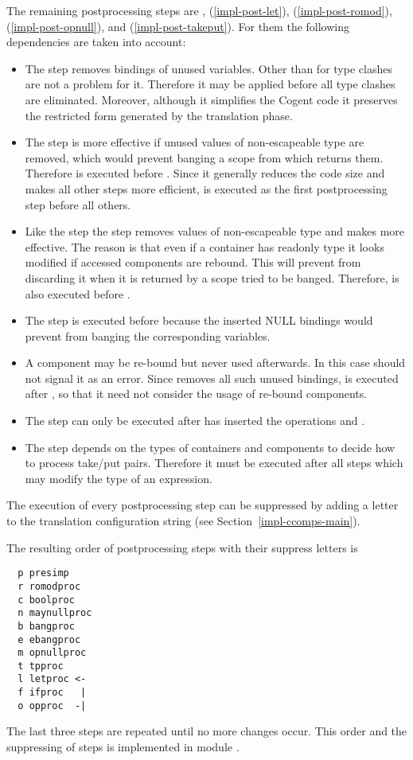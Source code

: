 The remaining postprocessing steps are , (\ref{impl-post-let}),  (\ref{impl-post-romod}),
 (\ref{impl-post-opnull}), and  (\ref{impl-post-takeput}).
For them the following dependencies are taken into account:
\begin{itemize}
\item The  step removes bindings of unused variables. Other than for  type clashes are not a problem
for it. Therefore it may be applied before all type clashes are eliminated. Moreover, although it simplifies the Cogent code it
preserves the restricted form generated by the translation phase.
\item The  step is more effective if unused values of non-escapeable type are removed, which would prevent banging
a scope from which returns them. Therefore  is executed before . Since it generally reduces the
code size and makes all other steps more efficient,  is executed as the first postprocessing step before all others.
\item Like the  step the  step removes values of non-escapeable type and makes 
more effective. The reason is that even if a container has readonly type it looks modified if accessed components are rebound.
This will prevent  from discarding it when it is returned by a scope tried to be banged. Therefore, 
is also executed before .
\item The  step is executed before  because the inserted NULL bindings would prevent 
from banging the corresponding variables.
\item A component may be re-bound but never used afterwards. In this case  should not signal it as an error.
Since  removes all such unused bindings,  is executed after , so that it need not
consider the usage of re-bound components.
\item The  step can only be executed after  has inserted the operations  and
.
\item The  step depends on the types of containers and components to decide how to process take/put pairs. Therefore
it must be executed after all steps which may modify the type of an expression.
\end{itemize}

The execution of every postprocessing step can be suppressed by adding a letter to the translation configuration string (see
Section~\ref{impl-ccomps-main}).

The resulting order of postprocessing steps with their suppress letters is
\begin{verbatim}
  p presimp
  r romodproc
  c boolproc
  n maynullproc
  b bangproc
  e ebangproc
  m opnullproc
  t tpproc
  l letproc <-
  f ifproc   |
  o opproc  -|
\end{verbatim}
The last three steps are repeated until no more changes occur. This order and the suppressing of steps is implemented
in module .

